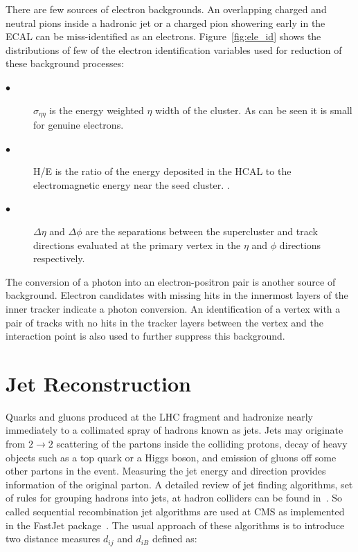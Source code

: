 There are few sources of electron backgrounds. An overlapping charged and neutral pions inside a hadronic jet or a charged pion showering early in the ECAL can be miss-identified as an electrons. Figure~\ref{fig:ele_id} shows the distributions of few of the electron identification variables used for reduction of these background processes:
 
\begin{description}
\item[$\bullet$]  $\sigma_{\eta\eta}$ is the energy weighted $\eta$ width of the cluster. As can be seen it is small for genuine electrons.  
\item[$\bullet$]  H/E is the ratio of the energy deposited in the HCAL to the electromagnetic energy near the seed cluster. .
\item[$\bullet$] $\Delta \eta$ and $\Delta \phi$ are the separations between the supercluster and track directions evaluated at the primary vertex in the $\eta$ and $\phi$ directions respectively.  
\end{description}

The conversion of a photon into an electron-positron pair is another source of background. Electron candidates with missing hits in the innermost layers of the inner tracker indicate a photon conversion. An identification of a vertex with a pair of tracks with no hits in the tracker layers between the vertex and the interaction point is also used to further suppress this background.


\section{Jet Reconstruction}

Quarks and gluons produced at the LHC fragment and hadronize nearly immediately to a collimated spray of hadrons known as jets. Jets may originate from $2 \rightarrow 2$ scattering of the partons inside the colliding protons, decay of heavy objects such as a top quark or a Higgs boson, and emission of gluons off some other partons in the event. Measuring the jet energy and direction provides information of the original parton. A detailed review of jet finding algorithms, set of rules for grouping hadrons into jets, at hadron colliders can be found in~\cite{Salam:2009jx}. So called sequential recombination jet algorithms are used at CMS as implemented in the FastJet package~\cite{Cacciari:2011ma}.  The usual approach of these algorithms is to introduce two distance measures $d_{ij}$ and $d_{iB}$ defined as:

